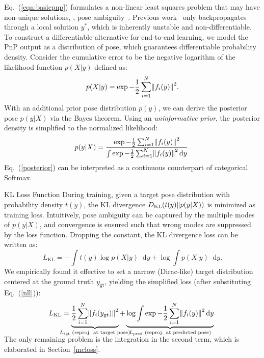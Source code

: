 \documentclass[10pt,twocolumn,letterpaper]{article}
\makeatletter
\let\originalleft\left
\let\originalright\right
\renewcommand{\left}{\mathopen{}\mathclose\bgroup\originalleft}
\renewcommand{\right}{\aftergroup\egroup\originalright}
\newcommand{\diff}{\mathop{}\!\mathrm{d}}
\renewcommand{\paragraph}{
  \@startsection{paragraph}{4}
  {\z@}{1.0ex \@plus 0ex \@minus .3ex}{-1em}
  {\normalfont\normalsize\bfseries}
}
\makeatother
\begin{document}
Eq.~(\ref{eqn:basicpnp}) formulates a non-linear least squares problem that may have non-unique solutions, \ie, pose ambiguity~\cite{manhardt2019, Schweighofer2006}. Previous work~\cite{dsac++, BPnP, blindpnp} only backpropagates through a local solution $y^\ast$, which is inherently unstable and non-differentiable.
To construct a differentiable alternative for end-to-end learning, we model the PnP output as a distribution of pose, which guarantees differentiable probability density. Consider the cumulative error to be the negative logarithm of the likelihood function $p(X|y)$ defined as:
\begin{equation}
p \left(X \middle| y \right) = \exp -\frac{1}{2} \sum_{i=1}^N \left\| f_i(y) \right\|^2 .
\label{nll}
\end{equation}
With an additional prior pose distribution $p(y)$, we can derive the posterior pose $p(y|X)$ via the Bayes theorem. Using an \emph{uninformative prior}, the posterior density is simplified to the normalized likelihood:
\begin{equation}
p(y|X)
= \frac{\exp -\frac{1}{2} \sum_{i=1}^N \left\| f_i(y) \right\|^2}{ \int \exp -\frac{1}{2} \sum_{i=1}^N \left\| f_i(y) \right\|^2 \diff{y}}.
\label{posterior}
\end{equation}
Eq.~(\ref{posterior}) can be interpreted as a continuous counterpart of categorical Softmax.

\paragraph{KL Loss Function}
During training, given a target pose distribution with probability density $t(y)$, the KL divergence $D_\text{KL}\left(t(y) \| p(y|X) \right)$ is minimized as training loss. Intuitively, pose ambiguity can be captured by the multiple modes of $p(y|X)$, and convergence is ensured such that wrong modes are suppressed by the loss function. Dropping the constant, the KL divergence loss can be written as:
\begin{equation}
L_\text{KL} = -\int t(y) \log p(X|y) \diff{y} + \log \int p(X|y) \diff{y}.
\end{equation}
We empirically found it effective to set a narrow (Dirac-like) target distribution centered at the ground truth $y_\text{gt}$, yielding the simplified loss (after substituting Eq.~(\ref{nll})):
\begin{equation} 
L_\text{KL} = \smash[b]{\underbrace{\frac{1}{2} \sum_{i=1}^N \left\| f_i(y_\text{gt}) \right\|^2}_{\mathclap{L_\text{tgt} \text{ (reproj. at target pose)}}} + \underbrace{\log \int \exp - \frac{1}{2} \sum_{i=1}^N \left\| f_i(y) \right\|^2 \diff{y}}_{L_\text{pred}\text{ (reproj. at predicted pose)}}}. \vphantom{\underbrace{\sum}_{O_o}}
\label{symbloss}
\end{equation}
The only remaining problem is the integration in the second term, which is elaborated in Section~\ref{mcloss}.
\end{document}
